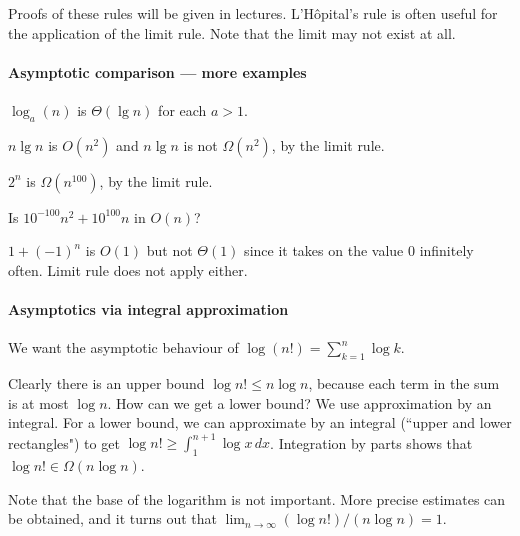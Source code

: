 Proofs of these rules will be given in lectures. L'H\^{o}pital's rule is often useful for the application of the limit rule. Note that the 
limit may not exist at all.

\paragraph{Asymptotic comparison --- more examples}

\begin{Boxample}[4]
\item $\log_a(n)$ is $\Theta(\lg n)$ for each $a > 1$.

\end{Boxample}

\begin{Example}
$n \lg n$ is $O(n^2)$ and $n \lg n$ is not $\Omega(n^2)$, by the limit rule.
\end{Example}
\begin{Example}
$2^n$ is $\Omega(n^{100})$, by the limit rule.
\end{Example}

\begin{Boxample}[4]
Is $10^{-100} n^2 + 10^{100} n$ in $O(n)$?

\end{Boxample}

\begin{Example}
$1 + (-1)^n$ is $O(1)$ but not $\Theta(1)$ since it takes on the value $0$
 infinitely often. Limit rule does not apply either.
 \end{Example}
 
 \paragraph{Asymptotics via integral approximation}
\begin{Boxample}[8]
We want the asymptotic behaviour of $\log (n!) = \sum_{k=1}^n \log k$.

Clearly there is an upper bound $\log n! \leq n \log n$, because each term in the sum is at most $\log n$. 
How can we get a lower bound? We use approximation by an integral.
For a lower bound, we can approximate by an integral (``upper and lower rectangles") to get 
$\log n! \geq \int_1^{n+1} \log x \, dx$. Integration by parts shows that 
$\log n! \in \Omega(n \log n)$.

\item Note that the base of the logarithm is not important. More precise estimates can 
be obtained, and it turns out that $\lim_{n\to \infty} (\log n!)/(n \log n) = 1$.
\fi
\end{Boxample}

